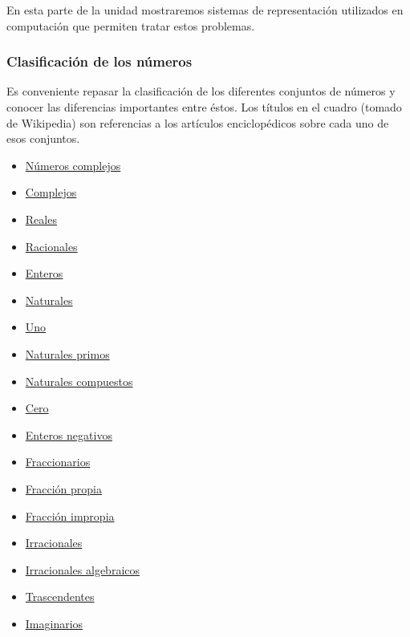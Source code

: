 \documentclass[spanish,a4paper,]{article}
\providecommand{\tightlist}{%
  \setlength{\itemsep}{0pt}\setlength{\parskip}{0pt}}
\begin{document}
En esta parte de la unidad mostraremos sistemas de representación
utilizados en computación que permiten tratar estos problemas.

\hypertarget{clasificaciuxf3n-de-los-nuxfameros}{%
\subsubsection{Clasificación de los
números}\label{clasificaciuxf3n-de-los-nuxfameros}}

Es conveniente repasar la clasificación de los diferentes conjuntos de
números y conocer las diferencias importantes entre éstos. Los títulos
en el cuadro (tomado de Wikipedia) son referencias a los artículos
enciclopédicos sobre cada uno de esos conjuntos.

\begin{itemize}
\tightlist
\item
  \href{https://es.m.wikipedia.org/wiki/N\%C3\%BAmero_complejo}{Números
  complejos}
\item
  \href{https://es.m.wikipedia.org/wiki/N\%C3\%BAmero_complejo}{Complejos}
\item
  \href{https://es.m.wikipedia.org/wiki/N\%C3\%BAmero_real}{Reales}
\item
  \href{https://es.m.wikipedia.org/wiki/N\%C3\%BAmero_racional}{Racionales}
\item
  \href{https://es.m.wikipedia.org/wiki/N\%C3\%BAmero_entero}{Enteros}
\item
  \href{https://es.m.wikipedia.org/wiki/N\%C3\%BAmero_natural}{Naturales}
\item
  \href{https://es.m.wikipedia.org/wiki/Uno}{Uno}
\item
  \href{https://es.m.wikipedia.org/wiki/N\%C3\%BAmero_primo}{Naturales
  primos}
\item
  \href{https://es.m.wikipedia.org/wiki/N\%C3\%BAmero_compuesto}{Naturales
  compuestos}
\item
  \href{https://es.m.wikipedia.org/wiki/Cero}{Cero}
\item
  \href{https://es.m.wikipedia.org/wiki/Entero_negativo}{Enteros
  negativos}
\item
  \href{https://es.m.wikipedia.org/wiki/N\%C3\%BAmero_fraccionario}{Fraccionarios}
\item
  \href{https://es.m.wikipedia.org/wiki/Fracci\%C3\%B3n_propia}{Fracción
  propia}
\item
  \href{https://es.m.wikipedia.org/wiki/Fracci\%C3\%B3n_impropia}{Fracción
  impropia}
\item
  \href{https://es.m.wikipedia.org/wiki/N\%C3\%BAmero_irracional}{Irracionales}
\item
  \href{https://es.m.wikipedia.org/wiki/N\%C3\%BAmero_algebraico}{Irracionales
  algebraicos}
\item
  \href{https://es.m.wikipedia.org/wiki/N\%C3\%BAmero_trascendente}{Trascendentes}
\item
  \href{https://es.m.wikipedia.org/wiki/N\%C3\%BAmero_imaginario}{Imaginarios}
\end{itemize}
\end{document}
